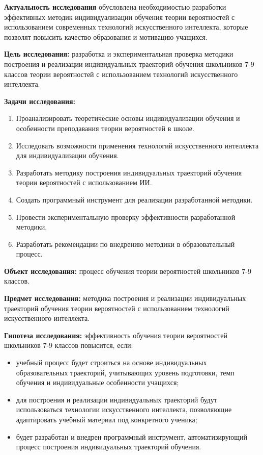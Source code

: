 \documentclass[a4paper,14pt]{extreport}
\begin{document}
\textbf{Актуальность исследования} обусловлена необходимостью разработки эффективных методик индивидуализации обучения теории вероятностей с использованием современных технологий искусственного интеллекта, которые позволят повысить качество образования и мотивацию учащихся.

\textbf{Цель исследования:} разработка и экспериментальная проверка методики построения и реализации индивидуальных траекторий обучения школьников 7-9 классов теории вероятностей с использованием технологий искусственного интеллекта.

\textbf{Задачи исследования:}
\begin{enumerate}
    \item Проанализировать теоретические основы индивидуализации обучения и особенности преподавания теории вероятностей в школе.
    \item Исследовать возможности применения технологий искусственного интеллекта для индивидуализации обучения.
    \item Разработать методику построения индивидуальных траекторий обучения теории вероятностей с использованием ИИ.
    \item Создать программный инструмент для реализации разработанной методики.
    \item Провести экспериментальную проверку эффективности разработанной методики.
    \item Разработать рекомендации по внедрению методики в образовательный процесс.
\end{enumerate}

\textbf{Объект исследования:} процесс обучения теории вероятностей школьников 7-9 классов.

\textbf{Предмет исследования:} методика построения и реализации индивидуальных траекторий обучения теории вероятностей с использованием технологий искусственного интеллекта.

\textbf{Гипотеза исследования:} эффективность обучения теории вероятностей школьников 7-9 классов повысится, если:
\begin{itemize}
    \item учебный процесс будет строиться на основе индивидуальных образовательных траекторий, учитывающих уровень подготовки, темп обучения и индивидуальные особенности учащихся;
    \item для построения и реализации индивидуальных траекторий будут использоваться технологии искусственного интеллекта, позволяющие адаптировать учебный материал под конкретного ученика;
    \item будет разработан и внедрен программный инструмент, автоматизирующий процесс построения индивидуальных траекторий обучения.
\end{itemize}
\end{document}
